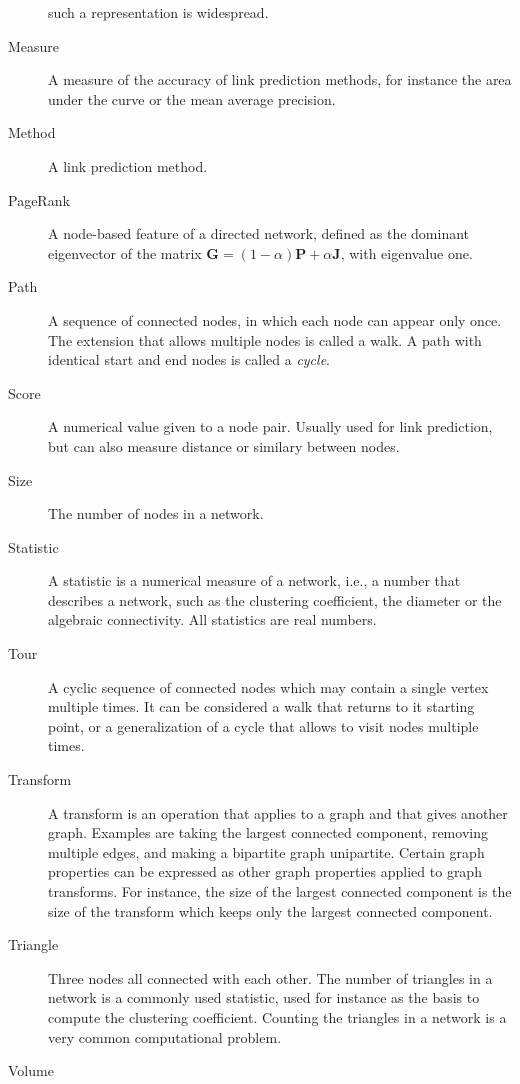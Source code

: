 \documentclass{article}
\begin{document}
\begin{description}
    such a representation is widespread. 
  \item[Measure]
    A measure of the accuracy of link prediction methods, for instance
    the area under the curve or the mean average precision.  
  \item[Method]
    A link prediction method. 
  \item[PageRank] 
    A node-based feature of a directed network, defined as the dominant
    eigenvector of the matrix $\mathbf G = (1-\alpha) \mathbf P +
    \alpha\mathbf J$, with eigenvalue one. 
  \item[Path]
    A sequence of connected nodes, in which each node can appear only
    once.  The extension that allows multiple nodes is called a walk.  A
    path with identical start and end nodes is called a \emph{cycle}. 
  \item[Score]
    A numerical value given to a node pair.  Usually used for link
    prediction, but can also measure distance or similary between
    nodes. 
  \item[Size]
    The number of nodes in a network.  
  \item[Statistic]
    A statistic is a numerical measure of a network, i.e., a number that
    describes a network, such as the clustering coefficient, the
    diameter or the algebraic connectivity.  All statistics are real
    numbers.   
  \item[Tour]
    A cyclic sequence of connected nodes which may contain a single
    vertex multiple times.  It can be considered a walk that returns to
    it starting point, or a generalization of a cycle that allows to
    visit nodes multiple times.  
  \item[Transform] 
    A transform is an operation that applies to a graph and that gives
    another graph.  Examples are taking the largest connected component,
    removing multiple edges, and making a bipartite graph unipartite.
    Certain graph properties can be expressed as other graph properties
    applied to graph transforms.  For instance, the size of the largest
    connected component is the size of the transform which keeps only
    the largest connected component. 
  \item[Triangle]
    Three nodes all connected with each other.  The number of triangles
    in a network is a commonly used statistic, used for instance as
    the basis to compute the clustering coefficient.  Counting the
    triangles in a network is a very common computational problem.  
  \item[Volume]

\end{description}
\end{document}
